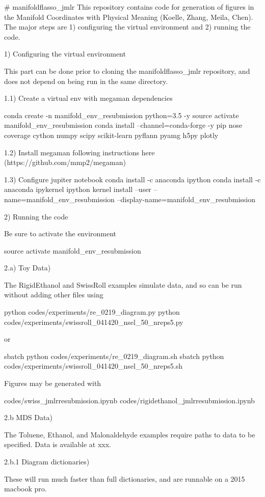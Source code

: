 # manifoldflasso_jmlr
This repository contains code for generation of figures in the Manifold Coordinates with Physical Meaning (Koelle, Zhang, Meila, Chen).
The major steps are 1) configuring the virtual environment and 2) running the code.

1) Configuring the virtual environment

This part can be done prior to cloning the manifoldflasso_jmlr repository, and does not depend on being run in the same directory.

1.1) Create a virtual env with megaman dependencies

conda create -n manifold_env_resubmission python=3.5 -y
source activate manifold_env_resubmission
conda install --channel=conda-forge -y pip nose coverage cython numpy scipy scikit-learn pyflann pyamg h5py plotly

1.2) Install megaman following instructions here (https://github.com/mmp2/megaman)

1.3) Configure jupiter notebook
conda install -c anaconda ipython
conda install -c anaconda ipykernel
ipython kernel install --user --name=manifold_env_resubmission --display-name=manifold_env_resubmission

2) Running the code

Be sure to activate the environment

source activate manifold_env_resubmission

2.a) Toy Data)

The RigidEthanol and SwissRoll examples simulate data, and so can be run without adding other files using 

python codes/experiments/re_0219_diagram.py
python codes/experiments/swissroll_041420_nsel_50_nreps5.py

or

sbatch python codes/experiments/re_0219_diagram.sh
sbatch python codes/experiments/swissroll_041420_nsel_50_nreps5.sh

Figures may be generated with 

codes/swiss_jmlrresubmission.ipynb
codes/rigidethanol_jmlrresubmission.ipynb

2.b MDS Data)

The Toluene, Ethanol, and Malonaldehyde examples require paths to data to be specified.
 Data is available at xxx.

2.b.1 Diagram dictionaries)

These will run much faster than full dictionaries, and are runnable on a 2015 macbook pro.

